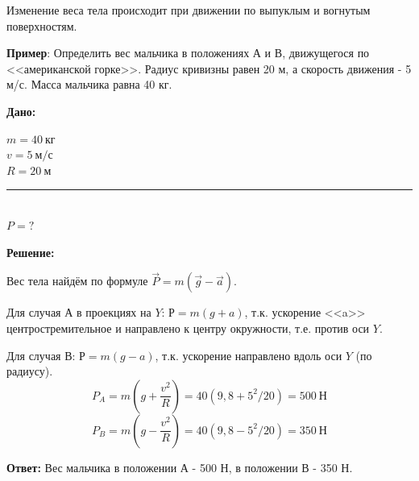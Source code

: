 \documentclass[a5paper, 10pt]{diss_4}
\renewcommand{\'}{\,'}
\begin{document}
Изменение веса тела происходит при движении по выпуклым и вогнутым поверхностям.

  \textbf{Пример}: Определить вес мальчика в положениях $А$ и $В$, движущегося
по <<американской горке>>. Радиус кривизны равен 20 м, а скорость движения - 5
м/с. Масса мальчика равна 40 кг.

\hspace{1cm}\textbf{Дано:}\hspace{.3cm}
\parbox[t]{4cm}{
$m=40\ кг$\\
$v=5\ м/с$\\
$R=20\ м$\\
\rule{4cm}{.4pt}\\
$P=?$
}

\textbf{Решение:}

Вес тела найдём по формуле $\vec{P}=m(\vec{g}-\vec{a})$.

Для случая $А$ в проекциях на $Y$: $Р=m(g+a)$, т.к. ускорение <<a>>
центростремительное и направлено к центру окружности, т.е. против оси $Y$.

Для случая $В$: $Р=m(g-a)$, т.к. ускорение направлено вдоль оси $Y$ (по радиусу).
\[
P_A=m(g+\frac{v^2}{R})=40(9,8+5^2/20)=500\ Н
\]
\[
P_B=m(g-\frac{v^2}{R})=40(9,8-5^2/20)=350\ Н
\]

\textbf{Ответ:} Вес мальчика в положении $А$ - 500 Н, в положении $В$ - 350 Н.
\end{document}
